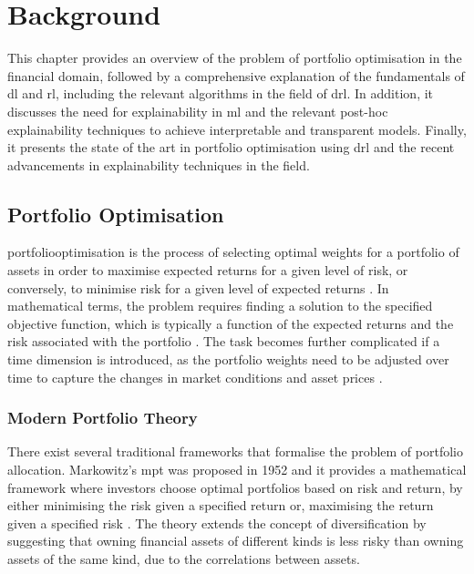 \chapter{Background} \label{ch:background}

This chapter provides an overview of the problem of portfolio optimisation in the financial domain, followed by a comprehensive explanation of the fundamentals of \acrfull{dl} and \acrfull{rl}, including the relevant algorithms in the field of \acrfull{drl}. In addition, it discusses the need for explainability in \acrfull{ml} and the relevant post-hoc explainability techniques to achieve interpretable and transparent models. Finally, it presents the state of the art in portfolio optimisation using \acrshort{drl} and the recent advancements in explainability techniques in the field. 

\section{Portfolio Optimisation} \label{sec:portfoliooptimisation}

\Gls{portfoliooptimisation} is the process of selecting optimal weights for a portfolio of assets in order to maximise expected returns for a given level of risk, or conversely, to minimise risk for a given level of expected returns \cite{Sato2019}. In mathematical terms, the problem requires finding a solution to the specified objective function, which is typically a function of the expected returns and the risk associated with the portfolio \cite{Bruce2014}. The task becomes further complicated if a time dimension is introduced, as the portfolio weights need to be adjusted over time to capture the changes in market conditions and asset prices \cite{Li2019}. 

\subsection{Modern Portfolio Theory}

There exist several traditional frameworks that formalise the problem of portfolio allocation. Markowitz's \acrfull{mpt} was proposed in 1952 \cite{Markowitz1952} and it provides a mathematical framework where investors choose optimal portfolios based on risk and return, by either minimising the risk given a specified return or, maximising the return given a specified risk \cite{kent}. The theory extends the concept of diversification by suggesting that owning financial assets of different kinds is less risky than owning assets of the same kind, due to the correlations between assets. 

